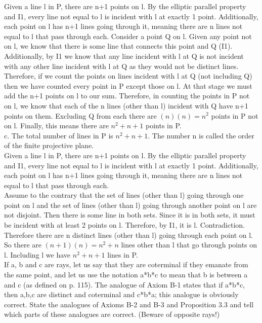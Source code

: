 \documentclass[12pt,letterpaper]{article}
\newcommand{\prob}[1]{\newpage\noindent {\bf #1}}
\begin{document}
Given a line l in P, there are n+1 points on l.  By the elliptic parallel property and I1, every line not equal to l is incident with l at exactly 1 point.  Additionally, each point on l has n+1 lines going through it, meaning there are n lines not equal to l that pass through each.  Consider a point Q on l. Given any point not on l, we know that there is some line that connects this point and Q (I1).  Additionally, by I1 we know that any line incident with l at Q is not incident with any other line incident with l at Q as they would not be distinct lines.  Therefore, if we count the points on lines incident with l at Q (not including Q) then we have counted every point in P except those on l.  At that stage we must add the n+1 points on l to our sum.  Therefore, in counting the points in P not on l, we know that each of the n lines (other than l) incident with Q have n+1 points on them.  Excluding Q from each there are $(n)(n) = n^2$ points in P not on l.  Finally, this means there are $n^2 + n + 1$ points in P.\\


c. The total number of lines in P is $n^2 + n + 1$.  The number n is called the order of the finite projective plane.\\

Given a line l in P, there are n+1 points on l.  By the elliptic parallel property and I1, every line not equal to l is incident with l at exactly 1 point.  Additionally, each point on l has n+1 lines going through it, meaning there are n lines not equal to l that pass through each.  \\

Assume to the contrary that the set of lines (other than l) going through one point on l and the set of lines (other than l) going through another point on l are not disjoint.  Then there is some line in both sets.  Since it is in both sets, it must be incident with at least 2 points on l.  Therefore, by I1, it is l.  Contradiction.  Therefore there are n distinct lines (other than l) going through each point on l.  So there are $(n+1)(n) = n^2 + n$ lines other than l that go through points on l.  Including l we have $n^2 + n+ 1$ lines in P.\\




\prob{14}  If a, b and c are rays, let us say that they are coterminal if they emanate from the same point, and let us use the notation a*b*c to mean that b is between a and c (as defined on p. 115).  The analogue of Axiom B-1 states that if a*b*c, then a,b,c are distinct and coterminal and c*b*a;  this analogue is obviously correct.  State the analogues of Axioms B-2 and B-3 and Proposition 3.3 and tell which parts of these analogues are correct.  (Beware of opposite rays!)\\
\end{document}
